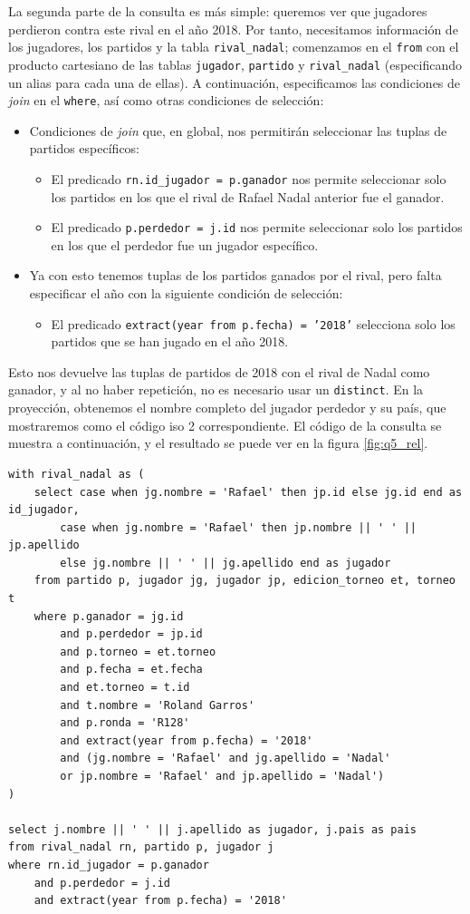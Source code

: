 \documentclass[11pt]{opticajnl}
\begin{document}
La segunda parte de la consulta es más simple: queremos ver que jugadores perdieron contra este rival en el año 2018. Por tanto, necesitamos información de los jugadores, los partidos y la tabla \texttt{rival\_nadal}; comenzamos en el \texttt{from} con el producto cartesiano de las tablas \texttt{jugador}, \texttt{partido} y \texttt{rival\_nadal} (especificando un alias para cada una de ellas). A continuación, especificamos las condiciones de \textit{join} en el \texttt{where}, así como otras condiciones de selección:
\begin{itemize}
\item Condiciones de \textit{join} que, en global, nos permitirán seleccionar las tuplas de partidos específicos:
\begin{itemize}
\item El predicado \texttt{rn.id\_jugador = p.ganador} nos permite seleccionar solo los partidos en los que el rival de Rafael Nadal anterior fue el ganador.
\item El predicado \texttt{p.perdedor = j.id} nos permite seleccionar solo los partidos en los que el perdedor fue un jugador específico.
\end{itemize}
\item Ya con esto tenemos tuplas de los partidos ganados por el rival, pero falta especificar el año con la siguiente condición de selección: 
\begin{itemize}
\item El predicado \texttt{extract(year from p.fecha) = '2018'} selecciona solo los partidos que se han jugado en el año 2018.
\end{itemize}
\end{itemize}

Esto nos devuelve las tuplas de partidos de 2018 con el rival de Nadal como ganador, y al no haber repetición, no es necesario usar un \texttt{distinct}. En la proyección, obtenemos el nombre completo del jugador perdedor y su país, que mostraremos como el código iso 2 correspondiente. El código de la consulta se muestra a continuación, y el resultado se puede ver en la figura \ref{fig:q5_rel}.

\begin{verbatim}
with rival_nadal as (
	select case when jg.nombre = 'Rafael' then jp.id else jg.id end as id_jugador, 
		case when jg.nombre = 'Rafael' then jp.nombre || ' ' || jp.apellido 
		else jg.nombre || ' ' || jg.apellido end as jugador
	from partido p, jugador jg, jugador jp, edicion_torneo et, torneo t
	where p.ganador = jg.id 
		and p.perdedor = jp.id
		and p.torneo = et.torneo 
		and p.fecha = et.fecha
		and et.torneo = t.id 
		and t.nombre = 'Roland Garros'
		and p.ronda = 'R128'
		and extract(year from p.fecha) = '2018'
		and (jg.nombre = 'Rafael' and jg.apellido = 'Nadal' 
		or jp.nombre = 'Rafael' and jp.apellido = 'Nadal') 
)

select j.nombre || ' ' || j.apellido as jugador, j.pais as pais
from rival_nadal rn, partido p, jugador j
where rn.id_jugador = p.ganador 
	and p.perdedor = j.id
	and extract(year from p.fecha) = '2018'
\end{verbatim}
\end{document}

